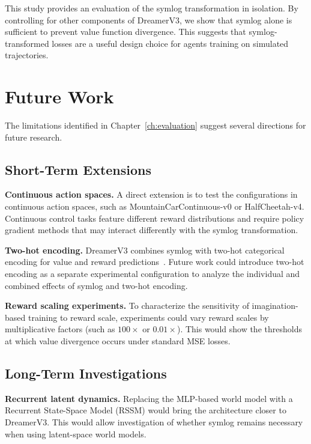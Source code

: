 This study provides an evaluation of the symlog transformation in isolation. By controlling for other components of DreamerV3, we show that symlog alone is sufficient to prevent value function divergence. This suggests that symlog-transformed losses are a useful design choice for agents training on simulated trajectories.

\section{Future Work}

The limitations identified in Chapter~\ref{ch:evaluation} suggest several directions for future research.

\subsection{Short-Term Extensions}

\textbf{Continuous action spaces.} A direct extension is to test the configurations in continuous action spaces, such as MountainCarContinuous-v0 or HalfCheetah-v4. Continuous control tasks feature different reward distributions and require policy gradient methods that may interact differently with the symlog transformation.

\textbf{Two-hot encoding.} DreamerV3 combines symlog with two-hot categorical encoding for value and reward predictions~\citep{hafner2023dreamerv3}. Future work could introduce two-hot encoding as a separate experimental configuration to analyze the individual and combined effects of symlog and two-hot encoding.

\textbf{Reward scaling experiments.} To characterize the sensitivity of imagination-based training to reward scale, experiments could vary reward scales by multiplicative factors (such as $100\times$ or $0.01\times$). This would show the thresholds at which value divergence occurs under standard MSE losses.

\subsection{Long-Term Investigations}

\textbf{Recurrent latent dynamics.} Replacing the MLP-based world model with a Recurrent State-Space Model (RSSM) would bring the architecture closer to DreamerV3. This would allow investigation of whether symlog remains necessary when using latent-space world models.

